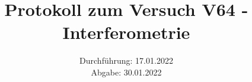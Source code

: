 \titlehead{\texttt{[image: resources/logo.jpg]}}
\title{Protokoll zum Versuch V64 - Interferometrie \\ }
\date{Durchführung: 17.01.2022 \\ Abgabe: 30.01.2022  }

